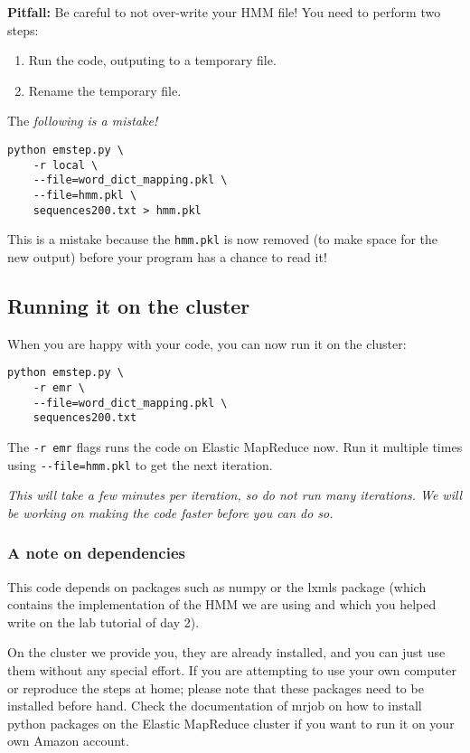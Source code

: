 \textbf{Pitfall:} Be careful to not over-write your HMM file! You need to
perform two steps:

\begin{enumerate}
\item Run the code, outputing to a temporary file.
\item Rename the temporary file.
\end{enumerate}

The \emph{following is a mistake!}
\begin{verbatim}
python emstep.py \
    -r local \
    --file=word_dict_mapping.pkl \
    --file=hmm.pkl \
    sequences200.txt > hmm.pkl
\end{verbatim}

This is a mistake because the \verb+hmm.pkl+ is now removed (to make space for
the new output) before your program has a chance to read it!

\subsection{Running it on the cluster}

When you are happy with your code, you can now run it on the cluster:

\begin{verbatim}
python emstep.py \
    -r emr \
    --file=word_dict_mapping.pkl \
    sequences200.txt
\end{verbatim}

The \verb+-r emr+ flags runs the code on Elastic MapReduce now. Run it multiple
times using \verb+--file=hmm.pkl+ to get the next iteration.

\emph{This will take a few minutes per iteration, so do not run many
iterations. We will be working on making the code faster before you can do
so.}

\subsubsection{A note on dependencies}

This code depends on packages such as numpy or the lxmls package (which
contains the implementation of the HMM we are using and which you helped write
on the lab tutorial of day 2).

On the cluster we provide you, they are already installed, and you can just use
them without any special effort. If you are attempting to use your own computer
or reproduce the steps at home; please note that these packages need to be
installed before hand. Check the documentation of mrjob on how to install
python packages on the Elastic MapReduce cluster if you want to run it on your
own Amazon account.

